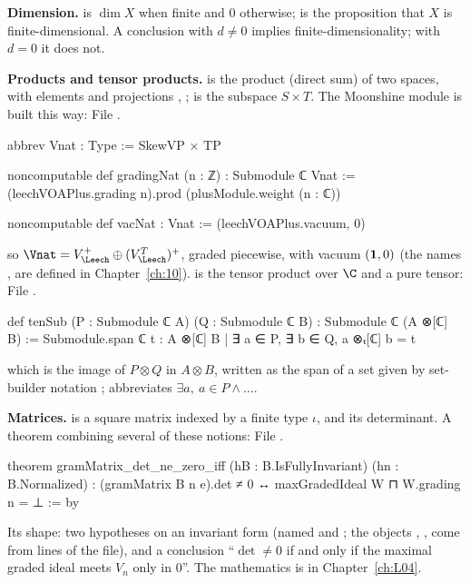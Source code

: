 \textbf{Dimension.}  is $\dim X$ when finite and $0$ otherwise;
 is the proposition that $X$ is finite-dimensional. A conclusion
 with $d\ne0$ implies finite-dimensionality; with $d = 0$ it does not.

\textbf{Products and tensor products.}  is the product (direct sum) of two spaces, with
elements  and projections , ;  is the subspace
$S\times T$. The Moonshine module is built this way:
\noindent File .
\begin{leancode}
abbrev Vnat : Type := SkewVP × TP

noncomputable def gradingNat (n : ℤ) : Submodule ℂ Vnat :=
  (leechVOAPlus.grading n).prod (plusModule.weight (n : ℂ))

noncomputable def vacNat : Vnat := (leechVOAPlus.vacuum, 0)
\end{leancode}
so $\Vnat = V_\Leech^+\oplus(V_\Leech^T)^+$, graded piecewise, with vacuum $(\mathbf{1},0)$ (the
names ,  are defined in Chapter~\ref{ch:10}).  is the tensor
product over $\C$ and  a pure tensor:
\noindent File .
\begin{leancode}
def tenSub (P : Submodule ℂ A) (Q : Submodule ℂ B) : Submodule ℂ (A ⊗[ℂ] B) :=
  Submodule.span ℂ {t : A ⊗[ℂ] B | ∃ a ∈ P, ∃ b ∈ Q, a ⊗ₜ[ℂ] b = t}
\end{leancode}
which is the image of $P\otimes Q$ in $A\otimes B$, written as the span of a set given by set-builder
notation ;  abbreviates $\exists a,\ a\in P\wedge\dots$.

\textbf{Matrices.}  is a square matrix indexed by a finite type $\iota$, and
 its determinant. A theorem combining several of these notions:
\noindent File .
\begin{leancode}
theorem gramMatrix_det_ne_zero_iff (hB : B.IsFullyInvariant) (hn : B.Normalized) :
    (gramMatrix B n e).det ≠ 0 ↔ maxGradedIdeal W ⊓ W.grading n = ⊥ := by
\end{leancode}
Its shape: two hypotheses on an invariant form  (named  and ; the objects
, ,  come from  lines of the file), and a conclusion
``$\det\ne0$ if and only if the maximal graded ideal meets $V_n$ only in $0$''. The mathematics is in
Chapter~\ref{ch:L04}.

